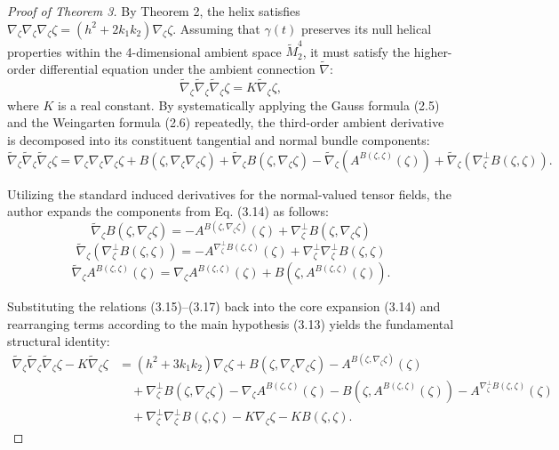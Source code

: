 \documentclass[10pt,a4paper]{amsart}
\begin{document}
\begin{proof}[Proof of Theorem 3]
By Theorem 2, the helix satisfies $\nabla_\zeta \nabla_\zeta \nabla_\zeta \zeta=(h^2+2k_1 k_2)\nabla_\zeta \zeta$. Assuming that $\gamma(t)$ preserves its null helical properties within the 4-dimensional ambient space $\tilde{M}_2^4$, it must satisfy the higher-order differential equation under the ambient connection $\tilde{\nabla}$:
\begin{equation}
\tilde{\nabla}_\zeta \tilde{\nabla}_\zeta \tilde{\nabla}_\zeta \zeta=K\tilde{\nabla}_\zeta \zeta,
\end{equation}
where $K$ is a real constant. By systematically applying the Gauss formula (2.5) and the Weingarten formula (2.6) repeatedly, the third-order ambient derivative is decomposed into its constituent tangential and normal bundle components:
\begin{equation}
\tilde{\nabla}_\zeta \tilde{\nabla}_\zeta \tilde{\nabla}_\zeta \zeta=\nabla_\zeta \nabla_\zeta \nabla_\zeta \zeta+B(\zeta,\nabla_\zeta \nabla_\zeta \zeta)+\tilde{\nabla}_\zeta B(\zeta,\nabla_\zeta \zeta) -\tilde{\nabla}_\zeta (A^{B(\zeta,\zeta)}(\zeta))+\tilde{\nabla}_\zeta (\nabla_\zeta^\perp B(\zeta,\zeta)).
\end{equation}

Utilizing the standard induced derivatives for the normal-valued tensor fields, the author expands the components from Eq. (3.14) as follows:
\begin{equation}
\tilde{\nabla}_\zeta B(\zeta,\nabla_\zeta \zeta)=-A^{B(\zeta,\nabla_\zeta \zeta)}(\zeta)+\nabla_\zeta^\perp B(\zeta,\nabla_\zeta \zeta)
\end{equation}
\begin{equation}
\tilde{\nabla}_\zeta (\nabla_\zeta^\perp B(\zeta,\zeta))=-A^{\nabla_\zeta^\perp B(\zeta,\zeta)}(\zeta)+\nabla_\zeta^\perp \nabla_\zeta^\perp B(\zeta,\zeta)
\end{equation}
\begin{equation}
\tilde{\nabla}_\zeta A^{B(\zeta,\zeta)}(\zeta)=\nabla_\zeta A^{B(\zeta,\zeta)}(\zeta)+B(\zeta,A^{B(\zeta,\zeta)}(\zeta)).
\end{equation}

Substituting the relations (3.15)--(3.17) back into the core expansion (3.14) and rearranging terms according to the main hypothesis (3.13) yields the fundamental structural identity:
\begin{equation}
\begin{aligned}
\tilde{\nabla}_\zeta \tilde{\nabla}_\zeta \tilde{\nabla}_\zeta \zeta-K\tilde{\nabla}_\zeta \zeta &= (h^2+3k_1 k_2)\nabla_\zeta \zeta+B(\zeta,\nabla_\zeta \nabla_\zeta \zeta)-A^{B(\zeta,\nabla_\zeta \zeta)}(\zeta) \\
&\quad +\nabla_\zeta^\perp B(\zeta,\nabla_\zeta \zeta)-\nabla_\zeta A^{B(\zeta,\zeta)}(\zeta)-B(\zeta,A^{B(\zeta,\zeta)}(\zeta))-A^{\nabla_\zeta^\perp B(\zeta,\zeta)}(\zeta) \\
&\quad +\nabla_\zeta^\perp \nabla_\zeta^\perp B(\zeta,\zeta)-K\nabla_\zeta \zeta-KB(\zeta,\zeta).
\end{aligned}
\end{equation}


\end{proof}
\end{document}
